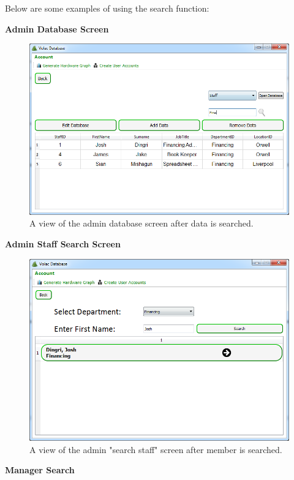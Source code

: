 Below are some examples of using the search function:

\textbf{Admin Database Screen}

\begin{figure}[H]
    \includegraphics[width=\textwidth]{./Evaluation/Images/afteradminsearch.png}
    \caption{A view of the admin database screen after data is searched.} 
\end{figure}

\textbf{Admin Staff Search Screen}

\begin{figure}[H]
    \includegraphics[width=\textwidth]{./Evaluation/Images/afteradv.png}
    \caption{A view of the admin "search staff" screen after member is searched.} \label{advsearch}
\end{figure}

\textbf{Manager Search}


